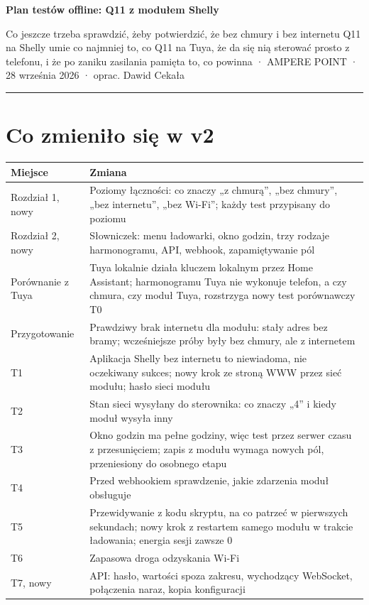 \documentclass[11pt,a4paper]{article}
\begin{document}
{\LARGE\bfseries Plan testów offline: Q11 z modułem Shelly\par}
{\large Co jeszcze trzeba sprawdzić, żeby potwierdzić, że bez chmury i bez internetu Q11 na Shelly umie co najmniej to, co Q11 na Tuya, że da się nią sterować prosto z telefonu, i że po zaniku zasilania pamięta to, co powinna · AMPERE POINT · 28 września 2026 · oprac. Dawid Cekała\par}
\vspace{4pt}\textcolor{apteal}{\rule{\textwidth}{1.2pt}}

\section*{Co zmieniło się w v2}

\begin{longtable}{>{\raggedright\arraybackslash}p{2.52cm}>{\raggedright\arraybackslash}p{13.20cm}}
\toprule
\rowcolor{apteallight}\textbf{Miejsce} & \textbf{Zmiana} \\
\midrule\endhead
\bottomrule\endfoot
Rozdział 1, nowy & Poziomy łączności: co znaczy „z chmurą”, „bez chmury”, „bez internetu”, „bez Wi-Fi”; każdy test przypisany do poziomu \\
Rozdział 2, nowy & Słowniczek: menu ładowarki, okno godzin, trzy rodzaje harmonogramu, API, webhook, zapamiętywanie pól \\
Porównanie z Tuya & Tuya lokalnie działa kluczem lokalnym przez Home Assistant; harmonogramu Tuya nie wykonuje telefon, a czy chmura, czy moduł Tuya, rozstrzyga nowy test porównawczy T0 \\
Przygotowanie & Prawdziwy brak internetu dla modułu: stały adres bez bramy; wcześniejsze próby były bez chmury, ale z internetem \\
T1 & Aplikacja Shelly bez internetu to niewiadoma, nie oczekiwany sukces; nowy krok ze stroną WWW przez sieć modułu; hasło sieci modułu \\
T2 & Stan sieci wysyłany do sterownika: co znaczy „4” i kiedy moduł wysyła inny \\
T3 & Okno godzin ma pełne godziny, więc test przez serwer czasu z przesunięciem; zapis z modułu wymaga nowych pól, przeniesiony do osobnego etapu \\
T4 & Przed webhookiem sprawdzenie, jakie zdarzenia moduł obsługuje \\
T5 & Przewidywanie z kodu skryptu, na co patrzeć w pierwszych sekundach; nowy krok z restartem samego modułu w trakcie ładowania; energia sesji zawsze 0 \\
T6 & Zapasowa droga odzyskania Wi-Fi \\
T7, nowy & API: hasło, wartości spoza zakresu, wychodzący WebSocket, połączenia naraz, kopia konfiguracji \\
\end{longtable}
\end{document}
